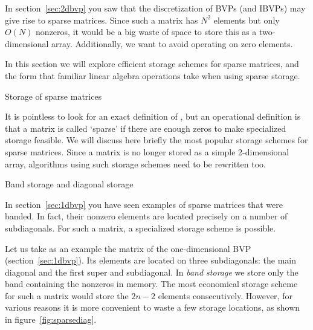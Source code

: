 
In section~\ref{sec:2dbvp} you saw that the discretization of
\ac{BVP}s (and \ac{IBVP}s) may give rise to sparse matrices.
Since such a matrix has $N^2$ elements but only $O(N)$
nonzeros, it would be a big waste of space to store this as a two-dimensional
array. Additionally, we want to avoid operating on zero elements.

In this section we will explore efficient storage schemes for sparse
matrices, and the form that familiar linear algebra operations take
when using sparse storage.

 {Storage of sparse matrices}
\label{sec:spmvp}


It is pointless to look for an exact definition of
, but an operational definition is that a
matrix is called `sparse' if there are enough zeros to make
specialized storage feasible. We will discuss here briefly the most
popular storage schemes for sparse matrices.
Since a matrix is no longer stored as a simple 2-dimensional array,
algorithms using such storage schemes need to be rewritten too. 

 {Band storage and diagonal storage}
\label{sec:diagonal-storage}
\label{sec:band-storage}

In section~\ref{sec:1dbvp} you have seen examples of sparse matrices
that were banded. In fact, their nonzero elements are located
precisely on a number of subdiagonals. For such a matrix, a
specialized storage scheme is possible.

Let us take as an example the matrix of the one-dimensional \ac{BVP}
(section~\ref{sec:1dbvp}). Its elements are located on three
subdiagonals: the main diagonal and the first super and
subdiagonal. In
\emph{band storage}
we store only the band containing the nonzeros
in memory. The most economical storage scheme for such a matrix would
store the $2n-2$ elements consecutively. However, for various reasons
it is more convenient to waste a few storage locations, as shown in
figure~\ref{fig:sparsediag}.

